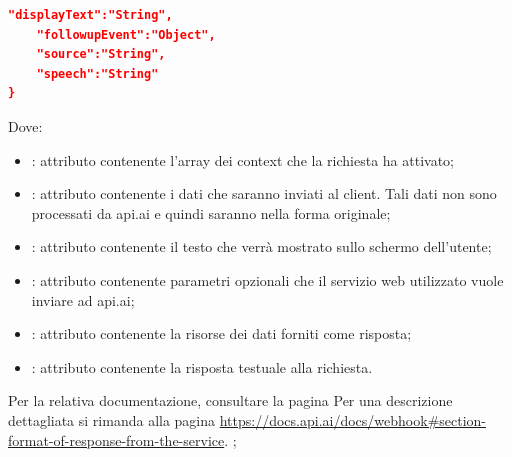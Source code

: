 \begin{itemize}
\begin{itemize}
\begin{itemize}
\begin{lstlisting}[language=json,firstnumber=1]
    "displayText":"String",
    "followupEvent":"Object",
    "source":"String",
    "speech":"String"
}
\end{lstlisting}
Dove:
\begin{itemize}
    \item {}: attributo contenente l'array dei context che la richiesta ha attivato;
    \item {}: attributo contenente i dati che saranno inviati al client. Tali dati non sono processati da api.ai e quindi saranno nella forma originale;
    \item {}: attributo contenente il testo che verrà mostrato sullo schermo dell'utente;
    \item {}: attributo contenente parametri opzionali che il servizio web utilizzato vuole inviare ad api.ai;
    \item {}: attributo contenente la risorse dei dati forniti come risposta;
    \item {}: attributo contenente la risposta testuale alla richiesta.
\end{itemize}

Per la relativa documentazione, consultare la pagina Per una descrizione dettagliata si rimanda alla pagina \url{https://docs.api.ai/docs/webhook#section-format-of-response-from-the-service}.
;
		\end{itemize}
	\end{itemize}
\end{itemize}
\FloatBarrier

